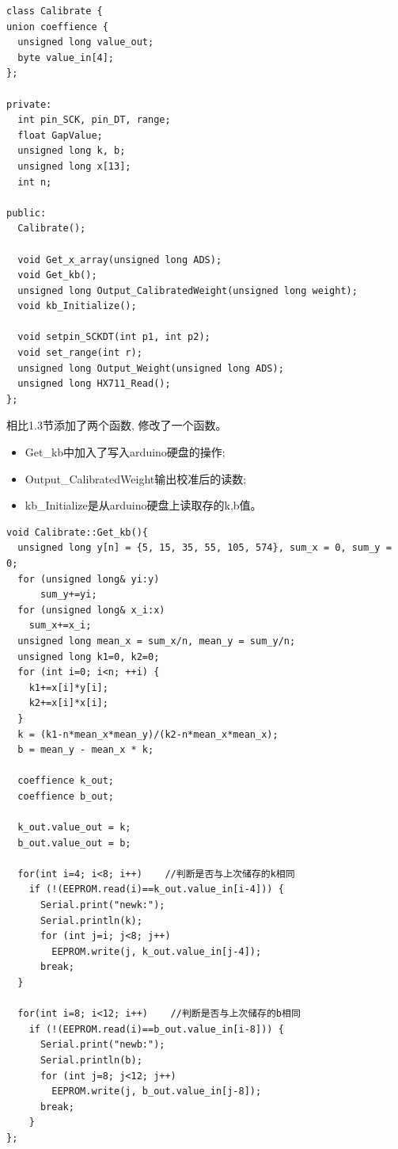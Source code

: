 \documentclass{article}
\begin{document}
\begin{lstlisting}
class Calibrate {
union coeffience {
  unsigned long value_out;
  byte value_in[4];
};

private:
  int pin_SCK, pin_DT, range; 
  float GapValue;
  unsigned long k, b;
  unsigned long x[13];
  int n;

public:
  Calibrate();

  void Get_x_array(unsigned long ADS);
  void Get_kb();
  unsigned long Output_CalibratedWeight(unsigned long weight);
  void kb_Initialize();

  void setpin_SCKDT(int p1, int p2);
  void set_range(int r);
  unsigned long Output_Weight(unsigned long ADS);
  unsigned long HX711_Read();
};
\end{lstlisting}

相比1.3节添加了两个函数, 修改了一个函数。
\begin{itemize}
  \item Get\_kb中加入了写入arduino硬盘的操作;
  \item Output\_CalibratedWeight输出校准后的读数;
  \item kb\_Initialize是从arduino硬盘上读取存的k,b值。
\end{itemize}

\begin{lstlisting}
void Calibrate::Get_kb(){
  unsigned long y[n] = {5, 15, 35, 55, 105, 574}, sum_x = 0, sum_y = 0;
  for (unsigned long& yi:y) 
      sum_y+=yi;
  for (unsigned long& x_i:x) 
    sum_x+=x_i;
  unsigned long mean_x = sum_x/n, mean_y = sum_y/n;
  unsigned long k1=0, k2=0;
  for (int i=0; i<n; ++i) {
    k1+=x[i]*y[i];
    k2+=x[i]*x[i];
  }
  k = (k1-n*mean_x*mean_y)/(k2-n*mean_x*mean_x);
  b = mean_y - mean_x * k;

  coeffience k_out;
  coeffience b_out;

  k_out.value_out = k;
  b_out.value_out = b;

  for(int i=4; i<8; i++)    //判断是否与上次储存的k相同
    if (!(EEPROM.read(i)==k_out.value_in[i-4])) {
      Serial.print("newk:");
      Serial.println(k);
      for (int j=i; j<8; j++) 
        EEPROM.write(j, k_out.value_in[j-4]);
      break;
  }
        
  for(int i=8; i<12; i++)    //判断是否与上次储存的b相同
    if (!(EEPROM.read(i)==b_out.value_in[i-8])) {
      Serial.print("newb:");
      Serial.println(b);
      for (int j=8; j<12; j++) 
        EEPROM.write(j, b_out.value_in[j-8]);
      break;
    }
};
\end{lstlisting}
\end{document}
